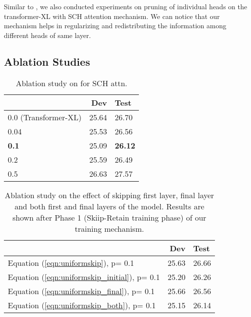 \documentclass[11pt]{article}
\begin{document}
Similar to \citep{DBLP:conf/nips/MichelLN19}, we also conducted experiments on pruning of individual heads on the transformer-XL with SCH attention mechanism. We can notice that our mechanism helps in regularizing and redistributing the information among different heads of same layer.




\subsection{Ablation Studies}
\label{Ablation_Study}


\begin{table}[!htb]
        

\begin{tabular}{lrl}
\hline \textbf{} & \textbf{Dev} & \textbf{Test} \\ 
\hline
0.0 (Transformer-XL) & 25.64 & 26.70 \\
\hline
0.04  & 25.53 & 26.56   \\
\textbf{0.1} & 25.09 & \textbf{26.12} \\
0.2 & 25.59  &  26.49 \\
0.5 & 26.63 & 27.57 \\
\hline
\end{tabular}
\caption{ Ablation study on  for SCH attn. } 
\label{abl:betawt103} 
\end{table}




\begin{table}[!htb]
\centering
\begin{tabular}{lrl}
\hline \textbf{} & \textbf{Dev} & \textbf{Test} \\ \hline
Equation (\ref{eqn:uniformskip}), p= 0.1 & 25.63 & 26.66  \\
Equation (\ref{eqn:uniformskip_initial}), p= 0.1 & 25.20 & 26.26  \\
Equation (\ref{eqn:uniformskip_final}), p= 0.1 & 25.66 & 26.56 \\
Equation (\ref{eqn:uniformskip_both}), p= 0.1 & 25.15 & 26.14 \\


\hline
\end{tabular}
\caption{\label{font-table} Ablation study on the effect of skipping first layer, final layer and both first and final layers of the model. Results are shown after Phase 1 (Skiip-Retain training phase) of our training mechanism.}
\label{table:skipwayswt103}

\end{table}
\end{document}
